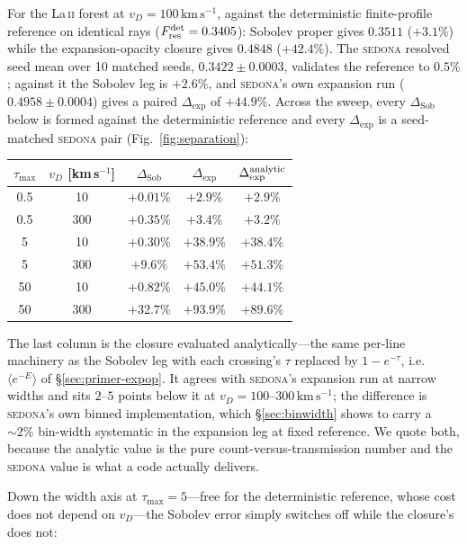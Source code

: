 \documentclass[fleqn,usenatbib]{mnras}
\newcommand{\dexp}{\Delta_{\mathrm{exp}}}
\newcommand{\dsobp}{\Delta_{\mathrm{Sob}}}
\newcommand{\kms}{\,\mathrm{km\,s^{-1}}}
\begin{document}
For the La\,\textsc{ii} forest at $v_D=100\kms$, against the deterministic
finite-profile reference on identical rays ($F_{\rm res}^{\rm det}=0.3405$):
Sobolev proper gives $0.3511$ ($+3.1\%$) while the expansion-opacity closure
gives $0.4848$ ($+42.4\%$). The \textsc{sedona} resolved seed mean over
10 matched seeds, $0.3422\pm0.0003$, validates the reference to
$0.5\%$; against it the Sobolev leg is $+2.6\%$, and
\textsc{sedona}'s own expansion run ($0.4958\pm0.0004$) gives a paired
$\dexp$ of $+44.9\%$. Across the sweep, every $\dsobp$ below is formed
against the deterministic reference and every $\dexp$ is a seed-matched
\textsc{sedona} pair (Fig.~\ref{fig:separation}):

\begin{table}
\centering
\small
\begin{tabular}{@{}ccccc@{}}
\toprule
$\tau_{\max}$ & $v_D$ [km\,s$^{-1}$] & $\dsobp$ & $\dexp$ & $\dexp^{\rm analytic}$ \\
\midrule
0.5 & 10  & $+0.01\%$ & $+2.9\%$  & $+2.9\%$ \\
0.5 & 300 & $+0.35\%$ & $+3.4\%$  & $+3.2\%$ \\
5   & 10  & $+0.30\%$ & $+38.9\%$ & $+38.4\%$ \\
5   & 300 & $+9.6\%$  & $+53.4\%$ & $+51.3\%$ \\
50  & 10  & $+0.82\%$ & $+45.0\%$ & $+44.1\%$ \\
50  & 300 & $+32.7\%$ & $+93.9\%$ & $+89.6\%$ \\
\bottomrule
\end{tabular}
\end{table}

The last column is the closure evaluated analytically---the same per-line
machinery as the Sobolev leg with each crossing's $\tau$ replaced by
$1-e^{-\tau}$, i.e.\ $\langle e^{-E}\rangle$ of \S\ref{sec:primer-expop}. It
agrees with \textsc{sedona}'s expansion run at narrow widths and sits
$2$--$5$ points below it at $v_D=100$--$300\kms$; the difference is
\textsc{sedona}'s own binned implementation, which \S\ref{sec:binwidth}
shows to carry a $\sim2\%$ bin-width systematic in the expansion leg at fixed
reference. We quote both, because the analytic value is the pure
count-versus-transmission number and the \textsc{sedona} value is what a code
actually delivers.

Down the width axis at $\tau_{\max}=5$---free for the deterministic reference,
whose cost does not depend on $v_D$---the Sobolev error simply switches off
while the closure's does not:
\end{document}

